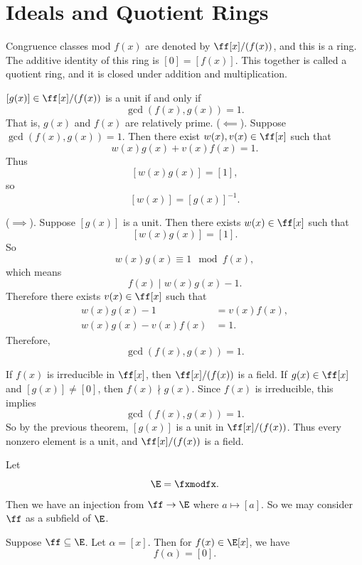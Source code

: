 
\section{Ideals and Quotient Rings}

\begin{definition}
Congruence classes mod $f(x)$ are denoted by $\ff[x]/(f(x))$, and this is a ring.
The additive identity of this ring is $[0]=[f(x)]$.
This together is called a quotient ring, and it is closed under addition and multiplication.
\end{definition}

\begin{theorem}[Class of $g(x)$]{
$[g(x)]\in \ff[x]/(f(x))$ is a unit if and only if
\[
\gcd(f(x),g(x))=1.
\]
That is, $g(x)$ and $f(x)$ are relatively prime.
}
($\impliedby$).
Suppose $\gcd(f(x),g(x))=1$.
Then there exist $w(x),v(x)\in \ff[x]$ such that
\[
w(x)g(x)+v(x)f(x)=1.
\]
Thus
\[
[w(x)g(x)]=[1],
\]
so
\[
[w(x)]=[g(x)]^{-1}.
\]

($\implies$).
Suppose $[g(x)]$ is a unit.
Then there exists $w(x)\in \ff[x]$ such that
\[
[w(x)g(x)]=[1].
\]
So
\[
w(x)g(x)\equiv 1 \mod f(x),
\]
which means
\[
f(x)\mid w(x)g(x)-1.
\]
Therefore there exists $v(x)\in \ff[x]$ such that
\begin{align*}
    w(x)g(x)-1 &= v(x)f(x),\\
    w(x)g(x)-v(x)f(x) &= 1.
\end{align*}
Therefore,
\[
\gcd(f(x),g(x))=1.
\]
\end{theorem}

\begin{corollary}{
If $f(x)$ is irreducible in $\ff[x]$, then $\ff[x]/(f(x))$ is a field.
}
If $g(x)\in \ff[x]$ and $[g(x)]\neq [0]$, then $f(x)\nmid g(x)$.
Since $f(x)$ is irreducible, this implies
\[
\gcd(f(x),g(x))=1.
\]
So by the previous theorem, $[g(x)]$ is a unit in $\ff[x]/(f(x))$.
Thus every nonzero element is a unit, and $\ff[x]/(f(x))$ is a field.
\end{corollary}

Let
\[
\E=\fxmodfx.
\]
Then we have an injection from $\ff\to\E$ where $a\mapsto [a]$.
So we may consider $\ff$ as a subfield of $\E$.

\begin{definition}
Suppose $\ff\subseteq \E$.
Let $\alpha=[x]$.
Then for $f(x)\in \E[x]$, we have
\[
f(\alpha)=[0].
\]
\end{definition}

